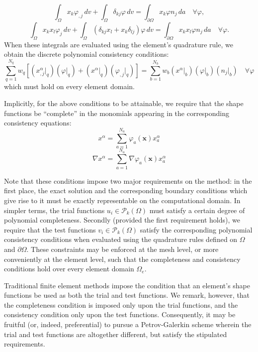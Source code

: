 \documentclass[11pt]{article} %
\begin{document}
\begin{equation}
	\int_{\Omega} x_k \varphi_{,j} \, dv + \int_{\Omega} \delta_{kj} \varphi\, dv = \int_{\partial \Omega} x_k \varphi n_j \, da \quad \forall \varphi,
\end{equation}
\begin{equation}
	\int_{\Omega} x_k x_l \varphi_{j} \, dv + \int_{\Omega} (\delta_{kj} x_l + x_k \delta_{lj}) \varphi \, dv = \int_{\partial \Omega} x_k x_l \varphi n_j \, da \quad \forall \varphi.
\end{equation}
When these integrals are evaluated using the element's quadrature rule, we obtain the discrete polynomial consistency conditions:
\begin{equation}
	\sum_{q=1}^{N_q} w_q \left[ (x^\alpha_{,j} |_q) (\varphi |_q) + (x^\alpha |_q) (\varphi_{,j} |_q) \right] = \sum_{b=1}^{N_b} w_b (x^\alpha |_b) (\varphi |_b) (n_j |_b) \quad \forall \varphi
\end{equation}
which must hold on every element domain.

Implicitly, for the above conditions to be attainable, we require that the shape functions be ``complete'' in the monomials appearing in the corresponding consistency equations:
\begin{equation}
	x^\alpha = \sum_{a=1}^{N_a} \varphi_a (\mathbf{x}) x^\alpha_a
\end{equation}
\begin{equation}
	\nabla x^\alpha = \sum_{a=1}^{N_a} \nabla \varphi_a (\mathbf{x}) x^\alpha_a
\end{equation}

Note that these conditions impose two major requirements on the method: in the first place, the exact solution and the corresponding boundary conditions which give rise to it must be exactly representable on the computational domain. In simpler terms, the trial functions $u_i \in \mathcal{P}_k(\Omega)$ must satisfy a certain degree of polynomial completeness. Secondly (provided the first requirement holds), we require that the test functions $v_i \in \mathcal{P}_k(\Omega)$ satisfy the corresponding polynomial consistency conditions when evaluated using the quadrature rules defined on $\Omega$ and $\partial \Omega$. These constraints may be enforced at the mesh level, or more conveniently at the element level, such that the completeness and consistency conditions hold over every element domain $\Omega_e$.

Traditional finite element methods impose the condition that an element's shape functions be used as both the trial and test functions. We remark, however, that the completeness condition is imposed only upon the trial functions, and the consistency condition only upon the test functions. Consequently, it may be fruitful (or, indeed, preferential) to pursue a Petrov-Galerkin scheme wherein the trial and test functions are altogether different, but satisfy the stipulated requirements.
\end{document}
